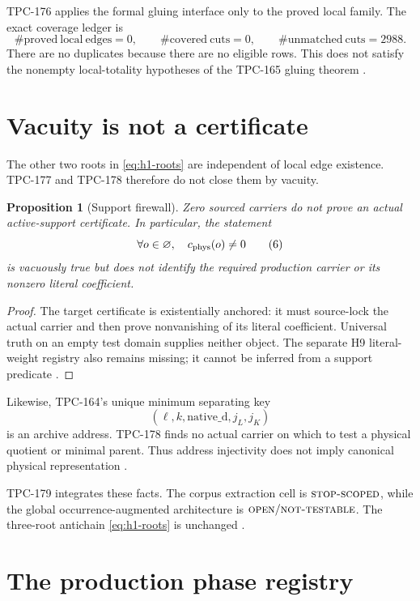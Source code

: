 \documentclass[11pt]{article}
\newtheorem{proposition}[theorem]{Proposition}
\theoremstyle{definition}
\theoremstyle{remark}
\newcommand{\NT}{\textnormal{\textsc{not-testable}}}
\newcommand{\STOP}{\textnormal{\textsc{stop-scoped}}}
\newcommand{\OPEN}{\textnormal{\textsc{open}}}
\begin{document}
TPC-176 applies the formal gluing interface only to the proved local
family.  The exact coverage ledger is
\[
\#\mathrm{proved\ local\ edges}=0,\qquad
\#\mathrm{covered\ cuts}=0,\qquad
\#\mathrm{unmatched\ cuts}=2988.
\tag{5}\label{eq:coverage}
\]
There are no duplicates because there are no eligible rows.  This
does not satisfy the nonempty local-totality hypotheses of the
TPC-165 gluing theorem \citep{WangTPC165,WangTPC176}.

\section{Vacuity is not a certificate}

The other two roots in \eqref{eq:h1-roots} are independent of local
edge existence.  TPC-177 and TPC-178 therefore do not close them by
vacuity.

\begin{proposition}[Support firewall]\label{prop:support}
Zero sourced carriers do not prove an actual active-support
certificate.  In particular, the statement
\[
\forall o\in\varnothing,\quad c_{\rm phys}(o)\ne0
\tag{6}\label{eq:vacuous}
\]
is vacuously true but does not identify the required production
carrier or its nonzero literal coefficient.
\end{proposition}

\begin{proof}
The target certificate is existentially anchored: it must source-lock
the actual carrier and then prove nonvanishing of its literal
coefficient.  Universal truth on an empty test domain supplies neither
object.  The separate H9 literal-weight registry also remains missing;
it cannot be inferred from a support predicate \citep{WangTPC177}.
\end{proof}

Likewise, TPC-164's unique minimum separating key
\[
(\ell,k,\mathrm{native\_d},j_L,j_K)
\tag{7}\label{eq:archive-key}
\]
is an archive address.  TPC-178 finds no actual carrier on which to
test a physical quotient or minimal parent.  Thus address injectivity
does not imply canonical physical representation
\citep{WangTPC164,WangTPC178}.

TPC-179 integrates these facts.  The corpus extraction cell is
\(\STOP\), while the global occurrence-augmented architecture is
\(\OPEN/\NT\).  The three-root antichain \eqref{eq:h1-roots} is
unchanged \citep{WangTPC179}.

\section{The production phase registry}
\end{document}
